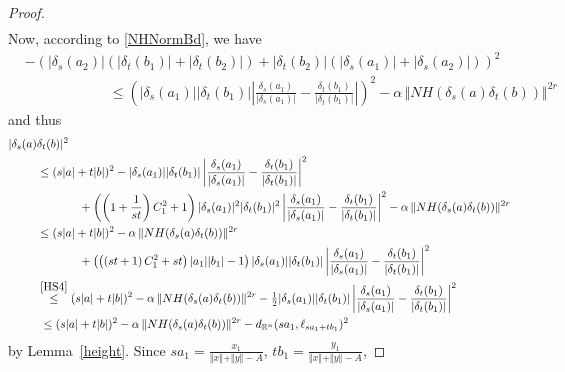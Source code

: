 \documentclass[11pt]{amsart}
\theoremstyle{definition}
\numberwithin{theorem}{section} \numberwithin{equation}{section}
\begin{document}
\begin{proof}
\begin{align*}
\end{align*}
Now, according to \eqref{NHNormBd}, we have
\begin{align*}
&-\left( |\delta_s (a_2)|(|\delta_{t}(b_1)|+|\delta_{t}(b_2)|) + |\delta_{t}(b_2)|(|\delta_s (a_1)| + |\delta_s (a_2)|) \right)^2 \\
&\hspace{1in} 
\leq \left( |\delta_s (a_1)| |\delta_{t} (b_1)| \left| \frac{\delta_s (a_1)}{|\delta_s (a_1)|} - \frac{\delta_{t} (b_1)}{|\delta_{t} (b_1)|} \right| \right)^2
-\alpha \, \Vert NH(\delta_{s}(a)\delta_{t}(b)) \Vert^{2r}
\end{align*}
and thus
\begin{align*}
|\delta_s (a) &\delta_{t}(b)|^2 \\
&\leq (s|a| + t|b|)^2 
- |\delta_s (a_1)||\delta_{t} (b_1)|
\left| \frac{\delta_s (a_1)}{|\delta_s (a_1)|} - \frac{\delta_{t} (b_1)}{|\delta_{t} (b_1)|} \right|^2 
\\
&\hspace{.5in} 
+  \left( \left(1+ \frac{1}{st} \right) C_1^2 + 1\right) |\delta_s (a_1)|^2 |\delta_{t} (b_1)|^2 \left| \frac{\delta_s (a_1)}{|\delta_s (a_1)|} - \frac{\delta_{t} (b_1)}{|\delta_{t} (b_1)|} \right|^2 
- \alpha \, \Vert NH(\delta_{s}(a)\delta_{t}(b)) \Vert^{2r} \\
&\leq (s|a| + t|b|)^2 
- \alpha \, \Vert NH(\delta_{s}(a)\delta_{t}(b)) \Vert^{2r}\\
&\hspace{.5in} 
+  \left(\left(  \left(st+ 1 \right) C_1^2 + st\right)|a_1||b_1| - 1 \right) |\delta_s (a_1)| |\delta_{t} (b_1)| \left| \frac{\delta_s (a_1)}{|\delta_s (a_1)|} - \frac{\delta_{t} (b_1)}{|\delta_{t} (b_1)|} \right|^2 \\
&\stackrel{\eqref{HS4}}{\leq} (s|a| + t|b|)^2 
- \alpha \, \Vert NH(\delta_{s}(a)\delta_{t}(b)) \Vert^{2r}
- \tfrac12 |\delta_s (a_1)| |\delta_{t} (b_1)| \left| \frac{\delta_s (a_1)}{|\delta_s (a_1)|} - \frac{\delta_{t} (b_1)}{|\delta_{t} (b_1)|} \right|^2\\
&\;\leq (s|a| + t|b|)^2 
- \alpha \, \Vert NH(\delta_{s}(a)\delta_{t}(b)) \Vert^{2r}
- d_{\mathbb{R}^n}(sa_1,\ell_{sa_1+tb_1})^2 
\end{align*}
by Lemma~\ref{height}.
Since $sa_1 = \frac{x_1}{\Vert x \Vert + \Vert y \Vert -A}$, 
$tb_1 = \frac{y_1}{\Vert x \Vert + \Vert y \Vert -A}$, 

\end{proof}
\end{document}
